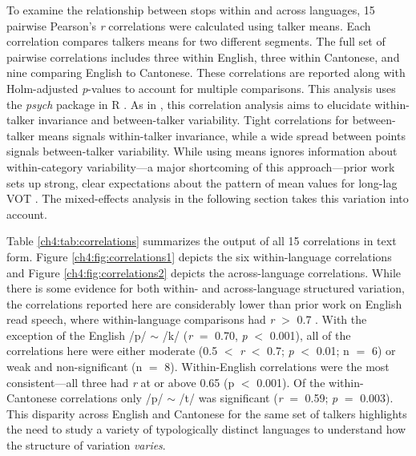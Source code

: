 To examine the relationship between stops within and across languages, 15 pairwise Pearson's \textit{r} correlations were calculated using talker means. Each correlation compares talkers means for two different segments. The full set of pairwise correlations includes three within English, three within Cantonese, and nine comparing English to Cantonese. These correlations are reported along with Holm-adjusted \textit{p}-values to account for multiple comparisons. This analysis uses the \textit{psych} \citep{revelle_2021_psych} package in R \citep{r_2021}. As in \citet{chodroff_2017_structure}, this correlation analysis aims to elucidate within-talker invariance and between-talker variability. Tight correlations for between-talker means signals within-talker invariance, while a wide spread between points signals between-talker variability. While using means ignores information about within-category variability---a major shortcoming of this approach---prior work sets up strong, clear expectations about the pattern of mean values for long-lag VOT \citep{chodroff_2017_structure, cho_1999_vot}. The mixed-effects analysis in the following section takes this variation into account.

Table \ref{ch4:tab:correlations} summarizes the output of all 15 correlations in text form. Figure \ref{ch4:fig:correlations1} depicts the six within-language correlations and Figure \ref{ch4:fig:correlations2} depicts the across-language correlations. While there is some evidence for both within- and across-language structured variation, the correlations reported here are considerably lower than prior work on English read speech, where within-language comparisons had \textit{r} $>$ 0.7 \citep{chodroff_2017_structure, chodroff_2019_l2}. With the exception of the English /p/ $\sim$ /k/ (\textit{r} $=$ 0.70, \textit{p} $<$ 0.001), all of the correlations here were either moderate (0.5 $<$ \textit{r} $<$ 0.7; \textit{p} $<$ 0.01; n $=$ 6) or weak and non-significant (n $=$ 8). Within-English correlations were the most consistent---all three had \textit{r} at or above 0.65 (p $<$ 0.001). Of the within-Cantonese correlations only /p/ $\sim$ /t/ was significant (\textit{r} $=$ 0.59; \textit{p} $=$ 0.003). This disparity across English and Cantonese for the same set of talkers highlights the need to study a variety of typologically distinct languages to understand how the structure of variation \textit{varies}.

